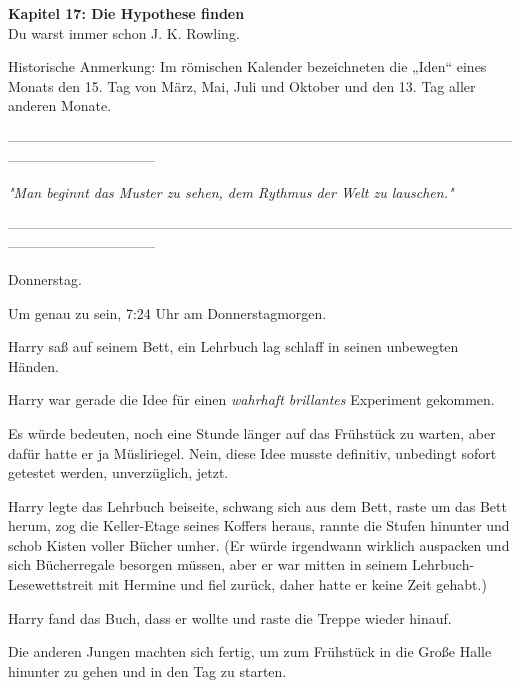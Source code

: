 

\hypertarget{die-hypothese-finden}{%

\textbf{Kapitel 17: Die Hypothese finden}\\

\hfill\break Du warst immer schon J. K. Rowling.

Historische Anmerkung: Im römischen Kalender bezeichneten die „Iden“ eines Monats den 15. Tag von März, Mai, Juli und Oktober und den 13. Tag aller anderen Monate.

--------------------------------------------------------------------------------------------------------------------------------------------

\hfill\break

\emph{"Man beginnt das Muster zu sehen, dem Rythmus der Welt zu lauschen."}

\hfill\break

--------------------------------------------------------------------------------------------------------------------------------------------

\hfill\break Donnerstag.

Um genau zu sein, 7:24 Uhr am Donnerstagmorgen.

Harry saß auf seinem Bett, ein Lehrbuch lag schlaff in seinen unbewegten Händen.

Harry war gerade die Idee für einen \emph{wahrhaft brillantes} Experiment gekommen.

Es würde bedeuten, noch eine Stunde länger auf das Frühstück zu warten, aber dafür hatte er ja Müsliriegel. Nein, diese Idee musste definitiv, unbedingt sofort getestet werden, unverzüglich, jetzt.

Harry legte das Lehrbuch beiseite, schwang sich aus dem Bett, raste um das Bett herum, zog die Keller-Etage seines Koffers heraus, rannte die Stufen hinunter und schob Kisten voller Bücher umher. (Er würde irgendwann wirklich auspacken und sich Bücherregale besorgen müssen, aber er war mitten in seinem Lehrbuch-Lesewettstreit mit Hermine und fiel zurück, daher hatte er keine Zeit gehabt.)

Harry fand das Buch, dass er wollte und raste die Treppe wieder hinauf.

Die anderen Jungen machten sich fertig, um zum Frühstück in die Große Halle hinunter zu gehen und in den Tag zu starten.

}

